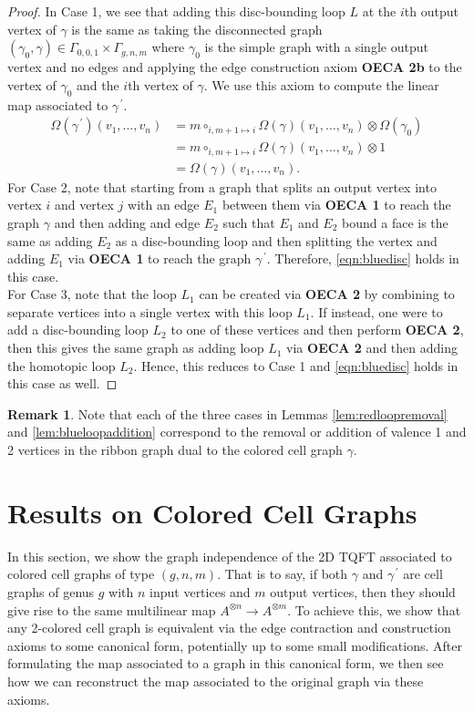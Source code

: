 \documentclass{amsart}
\newcommand{\tensor}{\otimes}
\newcommand{\Atn}{A^{\tensor n}}
\newcommand{\Atm}{A^{\tensor m}}
\newcommand{\pri}{^{\,\prime}}
\theoremstyle{definition}
\newtheorem{Rmk}[Lem]{Remark}
\begin{document}
\begin{proof}
    In Case 1, we see that adding this disc-bounding loop $L$ at the $i$th output vertex of $\gamma$ is the same as taking the disconnected graph $(\gamma_0,\gamma)\in\Gamma_{0,0,1}\times\Gamma_{g,n,m}$ where $\gamma_0$ is the simple graph with a single output vertex and no edges and applying the edge construction axiom \textbf{OECA 2b} to the vertex of $\gamma_0$ and the $i$th vertex of $\gamma$. We use this axiom to compute the linear map associated to $\gamma\pri$.
    \begin{align*}
        \Omega(\gamma\pri)(v_1,\ldots,v_n)&=m\circ_{i,m+1\mapsto i}\Omega(\gamma)(v_1,\ldots,v_n)\otimes \Omega(\gamma_0)\\
        &=m\circ_{i,m+1\mapsto i}\Omega(\gamma)(v_1,\ldots,v_n)\otimes 1\\
        &=\Omega(\gamma)(v_1,\ldots,v_n).
    \end{align*}
    For Case 2, note that starting from a graph that splits an output vertex into vertex $i$ and vertex $j$ with an edge $E_1$ between them via \textbf{OECA 1} to reach the graph $\gamma$ and then adding and edge $E_2$ such that $E_1$ and $E_2$ bound a face is the same as adding $E_2$ as a disc-bounding loop and then splitting the vertex and adding $E_1$ via \textbf{OECA 1} to reach the graph $\gamma\pri$. Therefore, \ref{eqn:bluedisc} holds in this case.\\
    For Case 3, note that the loop $L_1$ can be created via \textbf{OECA 2} by combining to separate vertices into a single vertex with this loop $L_1$. If instead, one were to add a disc-bounding loop $L_2$ to one of these vertices and then perform \textbf{OECA 2}, then this gives the same graph as adding loop $L_1$ via \textbf{OECA 2} and then adding the homotopic loop $L_2$. Hence, this reduces to Case 1 and \ref{eqn:bluedisc} holds in this case as well.
\end{proof}
\begin{Rmk}
    Note that each of the three cases in Lemmas \ref{lem:redloopremoval} and \ref{lem:blueloopaddition} correspond to the removal or addition of valence 1 and 2 vertices in the ribbon graph dual to the colored cell graph $\gamma$.
\end{Rmk}
\section{Results on Colored Cell Graphs}\label{Section 6}
In this section, we show the graph independence of the 2D TQFT associated to colored cell graphs of type $(g,n,m)$. That is to say, if both $\gamma$ and $\gamma\pri$ are cell graphs of genus $g$ with $n$ input vertices and $m$ output vertices, then they should give rise to the same multilinear map $\Atn\longrightarrow\Atm$. To achieve this, we show that any 2-colored cell graph is equivalent via the edge contraction and construction axioms to some canonical form, potentially up to some small modifications. After formulating the map associated to a graph in this canonical form, we then see how we can reconstruct the map associated to the original graph via these axioms.
\end{document}
